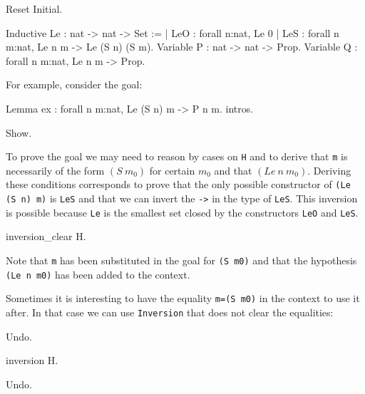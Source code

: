 \begin{coq_example*}
\begin{coq_eval}
Reset Initial.
\end{coq_eval}

\begin{coq_example*}
Inductive Le : nat -> nat -> Set :=
  | LeO : forall n:nat, Le 0%
  | LeS : forall n m:nat, Le n m -> Le (S n) (S m).
Variable P : nat -> nat -> Prop.
Variable Q : forall n m:nat, Le n m -> Prop.
\end{coq_example*}

For example, consider the goal:

\begin{coq_eval}
Lemma ex : forall n m:nat, Le (S n) m -> P n m.
intros.
\end{coq_eval}

\begin{coq_example}
Show.
\end{coq_example}

To prove the goal we may need to reason by cases on \texttt{H} and to 
 derive that \texttt{m}  is necessarily of
the form $(S~m_0)$ for certain $m_0$ and that $(Le~n~m_0)$.  
Deriving these conditions corresponds to prove that the
only possible constructor of \texttt{(Le (S n) m)}  is
\texttt{LeS} and that we can invert the 
\texttt{->} in the type  of \texttt{LeS}.  
This inversion is possible because \texttt{Le} is the smallest set closed by
the constructors \texttt{LeO} and \texttt{LeS}.

\begin{coq_example}
inversion_clear H.
\end{coq_example}

Note that \texttt{m} has been substituted in the goal for \texttt{(S m0)}
and that the hypothesis \texttt{(Le n m0)} has been added to the
context.

Sometimes it is
interesting to have the equality \texttt{m=(S m0)} in the
context to use it after. In that case we can use  \texttt{Inversion} that
does not clear the equalities:

\begin{coq_example*}
Undo.
\end{coq_example*}

\begin{coq_example}
inversion H.
\end{coq_example}

\begin{coq_eval}
Undo.
\end{coq_eval}



\end{coq_example*}
